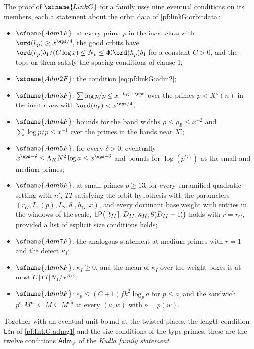 \begin{definition}\label{pf:linkG:admcond}
The proof of $\sfname{LinkG}$ for a family uses nine eventual conditions on its members, each a statement about the
orbit data of \cref{pf:linkG:orbitdata}:
\begin{itemize}
\item $\sfname{Adm1F}$: at every prime $p$ in the inert class with $\ord(h_p)\ge x^{\eps/4}$, the good orbits have
$\ord(h_p)\delta_1/(C\log x)\le N_v\le40\ord(h_p)\delta_1$ for a constant $C>0$, and the tops on them satisfy the
spacing conditions of clause 1;
\item $\sfname{Adm2F}$: the condition \eqref{eq:pf:linkG:adm2};
\item $\sfname{Adm3F}$: $\sum\log p/p\le x^{-h_G+\eps}$ over the primes $p<X''(n)$ in the inert class with
$\ord(h_p)<x^{\eps/4}$;
\item $\sfname{Adm4F}$: bounds for the band widths $\rho\le\rho_B\le x^{-2}$ and $\sum\log p/p\le x^{-1}$ over the primes in the
bands near $X'$;
\item $\sfname{Adm5F}$: for every $\delta>0$, eventually $x^{\eps-\delta}\le\Lambda_KN_1^2\log a\le x^{\eps+\delta}$ and
bounds for $\log(p^{G'_s})$ at the small and medium primes;
\item $\sfname{Adm6F}$: at small primes $p\ge13$, for every unramified quadratic setting with $n'$, $TT$ satisfying the
orbit hypothesis with the parameters $(r_G,L_1(p),L_2,\delta_1,h_G,x)$, and every dominant base weight with entries in
the windows of the scale, $\mathsf{LP}\bigl(\lceil t_{II}\rceil,D_{II},\kappa_{II},8(D_{II}+1)\bigr)$ holds with $r=r_G$,
provided a list of explicit size conditions holds;
\item $\sfname{Adm7F}$: the analogous statement at medium primes with $r=1$ and the defect $\kappa_I$;
\item $\sfname{Adm8F}$: $\kappa_I\ge0$, and the mean of $\kappa_I$ over the weight boxes is at most
$C\,|TT|N_1/x^{A/2}$;
\item $\sfname{Adm9F}$: $e_p\le(C+1)fk^2\log_pa$ for $p\le a$, and the sandwich $p^{e_p}M^{\mathrm{na}}\subseteq M\subseteq
M^{\mathrm{na}}$ at every $(u,w)$ with $p=p(w)$.
\end{itemize}
Together with an eventual unit bound at the twisted places, the length condition $\mathsf{Len}$ of
\cref{pf:linkG:admg1} and the size conditions of the type primes, these are the twelve conditions $\mathsf{Adm}_{\mathcal F}$ of the
\emph{Kudla family statement}.
\end{definition}

